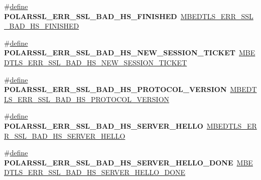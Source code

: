 \begin{DoxyCompactItemize}
\item 
\mbox{\label{compat-1_83_8h_ad5238dfb12be0905ef5243bedf195e9b}} 
\#\hyperlink{structdefine}{define} {\bfseries P\+O\+L\+A\+R\+S\+S\+L\+\_\+\+E\+R\+R\+\_\+\+S\+S\+L\+\_\+\+B\+A\+D\+\_\+\+H\+S\+\_\+\+F\+I\+N\+I\+S\+H\+ED}~\hyperlink{ssl_8h_a30610cf8e029daa83e34ff4ba572002a}{M\+B\+E\+D\+T\+L\+S\+\_\+\+E\+R\+R\+\_\+\+S\+S\+L\+\_\+\+B\+A\+D\+\_\+\+H\+S\+\_\+\+F\+I\+N\+I\+S\+H\+ED}
\item 
\mbox{\label{compat-1_83_8h_a5303c598a58f4cd226b8ca773e8445ce}} 
\#\hyperlink{structdefine}{define} {\bfseries P\+O\+L\+A\+R\+S\+S\+L\+\_\+\+E\+R\+R\+\_\+\+S\+S\+L\+\_\+\+B\+A\+D\+\_\+\+H\+S\+\_\+\+N\+E\+W\+\_\+\+S\+E\+S\+S\+I\+O\+N\+\_\+\+T\+I\+C\+K\+ET}~\hyperlink{ssl_8h_a5c64e204bc17d7ede8c0ef6b271d647d}{M\+B\+E\+D\+T\+L\+S\+\_\+\+E\+R\+R\+\_\+\+S\+S\+L\+\_\+\+B\+A\+D\+\_\+\+H\+S\+\_\+\+N\+E\+W\+\_\+\+S\+E\+S\+S\+I\+O\+N\+\_\+\+T\+I\+C\+K\+ET}
\item 
\mbox{\label{compat-1_83_8h_a17bbf98b50421818b851a0dca8c0da4b}} 
\#\hyperlink{structdefine}{define} {\bfseries P\+O\+L\+A\+R\+S\+S\+L\+\_\+\+E\+R\+R\+\_\+\+S\+S\+L\+\_\+\+B\+A\+D\+\_\+\+H\+S\+\_\+\+P\+R\+O\+T\+O\+C\+O\+L\+\_\+\+V\+E\+R\+S\+I\+ON}~\hyperlink{ssl_8h_ae8285bd18c5cbf25d9a9b6780f335081}{M\+B\+E\+D\+T\+L\+S\+\_\+\+E\+R\+R\+\_\+\+S\+S\+L\+\_\+\+B\+A\+D\+\_\+\+H\+S\+\_\+\+P\+R\+O\+T\+O\+C\+O\+L\+\_\+\+V\+E\+R\+S\+I\+ON}
\item 
\mbox{\label{compat-1_83_8h_a89e784e728eb487979ed1d66becea54e}} 
\#\hyperlink{structdefine}{define} {\bfseries P\+O\+L\+A\+R\+S\+S\+L\+\_\+\+E\+R\+R\+\_\+\+S\+S\+L\+\_\+\+B\+A\+D\+\_\+\+H\+S\+\_\+\+S\+E\+R\+V\+E\+R\+\_\+\+H\+E\+L\+LO}~\hyperlink{ssl_8h_a76613fe3ffc26a89bccd4d5d5e91df56}{M\+B\+E\+D\+T\+L\+S\+\_\+\+E\+R\+R\+\_\+\+S\+S\+L\+\_\+\+B\+A\+D\+\_\+\+H\+S\+\_\+\+S\+E\+R\+V\+E\+R\+\_\+\+H\+E\+L\+LO}
\item 
\mbox{\label{compat-1_83_8h_a0c3092523242ec70c8a83edae64ad24e}} 
\#\hyperlink{structdefine}{define} {\bfseries P\+O\+L\+A\+R\+S\+S\+L\+\_\+\+E\+R\+R\+\_\+\+S\+S\+L\+\_\+\+B\+A\+D\+\_\+\+H\+S\+\_\+\+S\+E\+R\+V\+E\+R\+\_\+\+H\+E\+L\+L\+O\+\_\+\+D\+O\+NE}~\hyperlink{ssl_8h_aa250f843c65ab2aff66e52ab5e667a0f}{M\+B\+E\+D\+T\+L\+S\+\_\+\+E\+R\+R\+\_\+\+S\+S\+L\+\_\+\+B\+A\+D\+\_\+\+H\+S\+\_\+\+S\+E\+R\+V\+E\+R\+\_\+\+H\+E\+L\+L\+O\+\_\+\+D\+O\+NE}

\end{DoxyCompactItemize}
